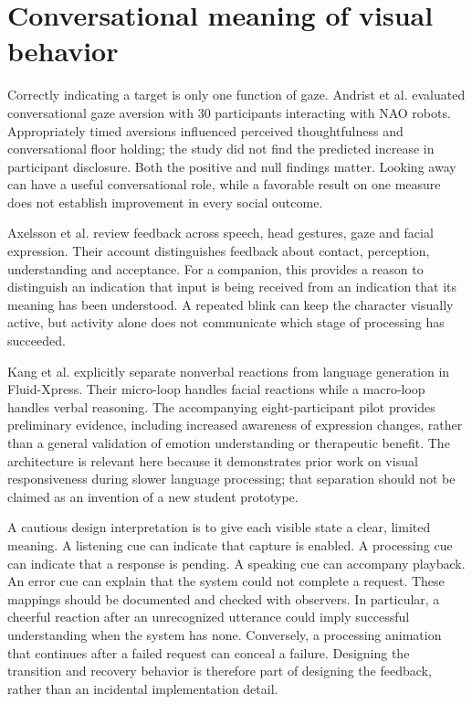 \documentclass[11pt,a4paper]{article}
\begin{document}
\section{Conversational meaning of visual behavior}

Correctly indicating a target is only one function of gaze. Andrist et al. \cite{r9} evaluated conversational gaze aversion with 30 participants interacting with NAO robots. Appropriately timed aversions influenced perceived thoughtfulness and conversational floor holding; the study did not find the predicted increase in participant disclosure. Both the positive and null findings matter. Looking away can have a useful conversational role, while a favorable result on one measure does not establish improvement in every social outcome.

Axelsson et al. \cite{r10} review feedback across speech, head gestures, gaze and facial expression. Their account distinguishes feedback about contact, perception, understanding and acceptance. For a companion, this provides a reason to distinguish an indication that input is being received from an indication that its meaning has been understood. A repeated blink can keep the character visually active, but activity alone does not communicate which stage of processing has succeeded.

Kang et al. \cite{r11} explicitly separate nonverbal reactions from language generation in Fluid-Xpress. Their micro-loop handles facial reactions while a macro-loop handles verbal reasoning. The accompanying eight-participant pilot provides preliminary evidence, including increased awareness of expression changes, rather than a general validation of emotion understanding or therapeutic benefit. The architecture is relevant here because it demonstrates prior work on visual responsiveness during slower language processing; that separation should not be claimed as an invention of a new student prototype.

A cautious design interpretation is to give each visible state a clear, limited meaning. A listening cue can indicate that capture is enabled. A processing cue can indicate that a response is pending. A speaking cue can accompany playback. An error cue can explain that the system could not complete a request. These mappings should be documented and checked with observers. In particular, a cheerful reaction after an unrecognized utterance could imply successful understanding when the system has none. Conversely, a processing animation that continues after a failed request can conceal a failure. Designing the transition and recovery behavior is therefore part of designing the feedback, rather than an incidental implementation detail.
\end{document}
